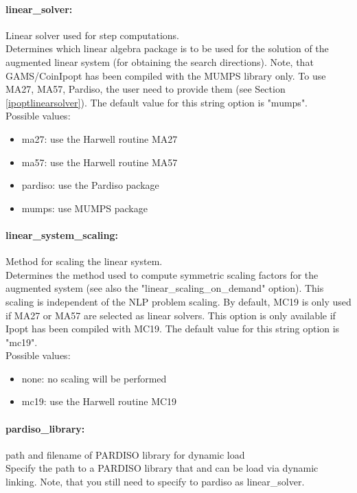 \paragraph{linear\_solver:}\label{sec:linear_solver} Linear solver used for step computations. $\;$ \\
 Determines which linear algebra package is to be
used for the solution of the augmented linear
system (for obtaining the search directions).
Note, that GAMS/CoinIpopt has been compiled with the MUMPS library only.
To use MA27, MA57, Pardiso, the user need to provide them (see Section \ref{ipoptlinearsolver}).
The default value for this string option is "mumps".
\\ 
Possible values:
\begin{itemize}
   \item ma27: use the Harwell routine MA27
   \item ma57: use the Harwell routine MA57
   \item pardiso: use the Pardiso package
   \item mumps: use MUMPS package
\end{itemize}

\paragraph{linear\_system\_scaling:}\label{sec:linear_system_scaling} Method for scaling the linear system. $\;$ \\
 Determines the method used to compute symmetric
scaling factors for the augmented system (see
also the "linear\_scaling\_on\_demand" option). 
This scaling is independent of the NLP problem
scaling.  By default, MC19 is only used if MA27
or MA57 are selected as linear solvers. This
option is only available if Ipopt has been
compiled with MC19.
The default value for this string option is "mc19".
\\ 
Possible values:
\begin{itemize}
   \item none: no scaling will be performed
   \item mc19: use the Harwell routine MC19
\end{itemize}

\paragraph{pardiso\_library:}\label{sec:pardiso_library} path and filename of PARDISO library for dynamic load $\;$ \\
 Specify the path to a PARDISO library that and
can be load via dynamic linking. Note, that you
still need to specify to pardiso as
linear\_solver.

